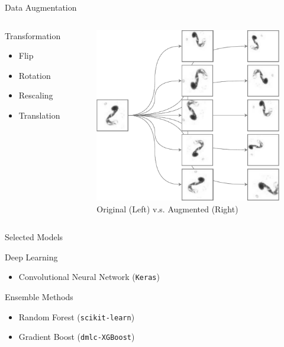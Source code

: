 \documentclass[mathserif]{beamer}
\begin{document}
\begin{frame}{Data Augmentation}
\begin{columns}[t]

\begin{block}{Transformation}
\begin{itemize}
  \item Flip
  \item Rotation
  \item Rescaling
  \item Translation
\end{itemize}
\end{block}

\begin{figure}[ht!]
\centering
\includegraphics[width=.7\linewidth]{fig/CSci-5525-data-augmentation-crop.pdf}
\caption{Original (Left) v.s. Augmented (Right)}
\end{figure}

\end{columns}
\end{frame}

\begin{frame}{Selected Models}
\begin{block}{Deep Learning}
\begin{itemize}
\item Convolutional Neural Network (\texttt{Keras})
\end{itemize}
\end{block}

\begin{block}{Ensemble Methods}
\begin{itemize}
  \item Random Forest (\texttt{scikit-learn})
  \item Gradient Boost (\texttt{dmlc-XGBoost})
\end{itemize}
\end{block}
\end{frame}
\end{document}
